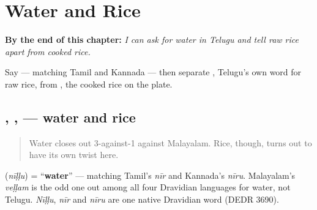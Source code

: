 
\chapter{Water and Rice}
\label{ch:te-water-and-rice}

\begin{chapteropening}
\textbf{By the end of this chapter:} \emph{I can ask for water in Telugu and tell raw rice apart from cooked rice.}

Say  — matching Tamil and Kannada — then separate , Telugu's own word for raw rice, from , the cooked rice on the plate.
\end{chapteropening}

\section[\texorpdfstring{\te{నీళ్ళు} \te{బియ్యం} \te{అన్నం} (nīḷḷu biyyam annam)}{నీళ్ళు బియ్యం అన్నం (nīḷḷu biyyam annam)}]{, ,  — water and rice}

\label{lesson:TE-C15-neellu-biyyam}



\begin{quote}
Water closes out 3-against-1 against Malayalam. Rice, though, turns out to have its own twist here.
\end{quote}

\begin{cousinweb}
\textbf{} (\emph{nīḷḷu}) = \textquotedblleft{}\textbf{water}\textquotedblright{} — matching Tamil's \emph{nīr} and Kannada's \emph{nīru}. Malayalam's \emph{veḷḷam} is the odd one out among all four Dravidian languages for water, not Telugu. \emph{Nīḷḷu}, \emph{nīr} and \emph{nīru} are one native Dravidian word (DEDR 3690).
\end{cousinweb}

